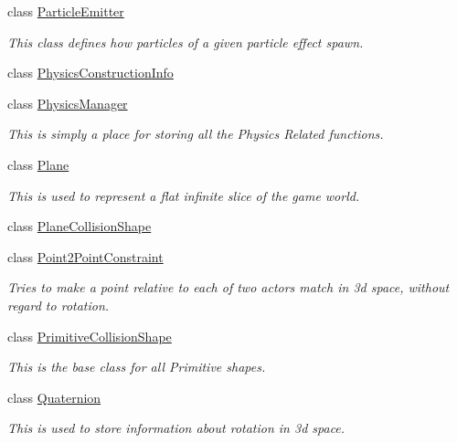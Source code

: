 \begin{DoxyCompactItemize}
class \hyperlink{classMezzanine_1_1ParticleEmitter}{ParticleEmitter}
\begin{DoxyCompactList}\small\item\em This class defines how particles of a given particle effect spawn. \item\end{DoxyCompactList}\item 
class \hyperlink{classMezzanine_1_1PhysicsConstructionInfo}{PhysicsConstructionInfo}
\item 
class \hyperlink{classMezzanine_1_1PhysicsManager}{PhysicsManager}
\begin{DoxyCompactList}\small\item\em This is simply a place for storing all the Physics Related functions. \item\end{DoxyCompactList}\item 
class \hyperlink{classMezzanine_1_1Plane}{Plane}
\begin{DoxyCompactList}\small\item\em This is used to represent a flat infinite slice of the game world. \item\end{DoxyCompactList}\item 
class \hyperlink{classMezzanine_1_1PlaneCollisionShape}{PlaneCollisionShape}
\item 
class \hyperlink{classMezzanine_1_1Point2PointConstraint}{Point2PointConstraint}
\begin{DoxyCompactList}\small\item\em Tries to make a point relative to each of two actors match in 3d space, without regard to rotation. \item\end{DoxyCompactList}\item 
class \hyperlink{classMezzanine_1_1PrimitiveCollisionShape}{PrimitiveCollisionShape}
\begin{DoxyCompactList}\small\item\em This is the base class for all Primitive shapes. \item\end{DoxyCompactList}\item 
class \hyperlink{classMezzanine_1_1Quaternion}{Quaternion}
\begin{DoxyCompactList}\small\item\em This is used to store information about rotation in 3d space. \item\end{DoxyCompactList}\item 

\end{DoxyCompactItemize}

